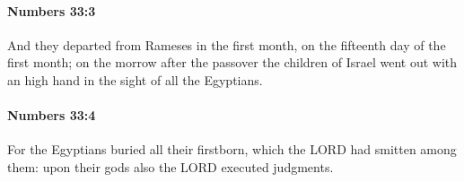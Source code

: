 		\paragraph{Numbers 33:3} %
			\label{NUMBERS-33-3}

			And they departed from Rameses in the first month, on the fifteenth day of the first month; on the morrow after the passover the children of Israel went out with an high hand in the sight of all the Egyptians.


		\paragraph{Numbers 33:4} %
			\label{NUMBERS-33-4}

			For the Egyptians buried all their firstborn, which the LORD had smitten among them: upon their gods also the LORD executed judgments.


